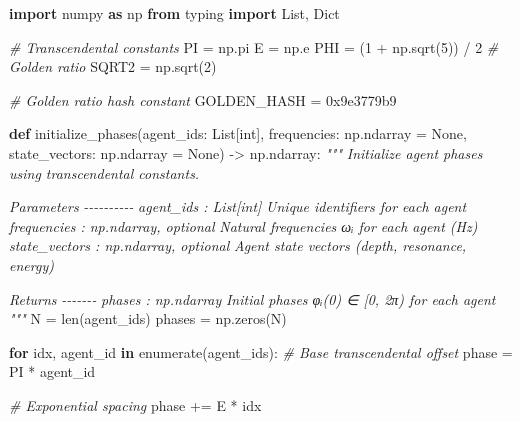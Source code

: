 \documentclass[
]{article}
\newenvironment{Shaded}{}{}
\newcommand{\BaseNTok}[1]{\textcolor[rgb]{0.25,0.63,0.44}{#1}}
\newcommand{\BuiltInTok}[1]{\textcolor[rgb]{0.00,0.50,0.00}{#1}}
\newcommand{\CommentTok}[1]{\textcolor[rgb]{0.38,0.63,0.69}{\textit{#1}}}
\newcommand{\ControlFlowTok}[1]{\textcolor[rgb]{0.00,0.44,0.13}{\textbf{#1}}}
\newcommand{\DecValTok}[1]{\textcolor[rgb]{0.25,0.63,0.44}{#1}}
\newcommand{\ImportTok}[1]{\textcolor[rgb]{0.00,0.50,0.00}{\textbf{#1}}}
\newcommand{\KeywordTok}[1]{\textcolor[rgb]{0.00,0.44,0.13}{\textbf{#1}}}
\newcommand{\NormalTok}[1]{#1}
\newcommand{\OperatorTok}[1]{\textcolor[rgb]{0.40,0.40,0.40}{#1}}
\newcommand{\VariableTok}[1]{\textcolor[rgb]{0.10,0.09,0.49}{#1}}
\begin{document}
\begin{Shaded}
\begin{Highlighting}[]
\ImportTok{import}\NormalTok{ numpy }\ImportTok{as}\NormalTok{ np}
\ImportTok{from}\NormalTok{ typing }\ImportTok{import}\NormalTok{ List, Dict}

\CommentTok{\# Transcendental constants}
\NormalTok{PI }\OperatorTok{=}\NormalTok{ np.pi}
\NormalTok{E }\OperatorTok{=}\NormalTok{ np.e}
\NormalTok{PHI }\OperatorTok{=}\NormalTok{ (}\DecValTok{1} \OperatorTok{+}\NormalTok{ np.sqrt(}\DecValTok{5}\NormalTok{)) }\OperatorTok{/} \DecValTok{2}  \CommentTok{\# Golden ratio}
\NormalTok{SQRT2 }\OperatorTok{=}\NormalTok{ np.sqrt(}\DecValTok{2}\NormalTok{)}

\CommentTok{\# Golden ratio hash constant}
\NormalTok{GOLDEN\_HASH }\OperatorTok{=} \BaseNTok{0x9e3779b9}

\KeywordTok{def}\NormalTok{ initialize\_phases(agent\_ids: List[}\BuiltInTok{int}\NormalTok{],}
\NormalTok{                     frequencies: np.ndarray }\OperatorTok{=} \VariableTok{None}\NormalTok{,}
\NormalTok{                     state\_vectors: np.ndarray }\OperatorTok{=} \VariableTok{None}\NormalTok{) }\OperatorTok{{-}\textgreater{}}\NormalTok{ np.ndarray:}
    \CommentTok{"""}
\CommentTok{    Initialize agent phases using transcendental constants.}

\CommentTok{    Parameters}
\CommentTok{    {-}{-}{-}{-}{-}{-}{-}{-}{-}{-}}
\CommentTok{    agent\_ids : List[int]}
\CommentTok{        Unique identifiers for each agent}
\CommentTok{    frequencies : np.ndarray, optional}
\CommentTok{        Natural frequencies ωᵢ for each agent (Hz)}
\CommentTok{    state\_vectors : np.ndarray, optional}
\CommentTok{        Agent state vectors (depth, resonance, energy)}

\CommentTok{    Returns}
\CommentTok{    {-}{-}{-}{-}{-}{-}{-}}
\CommentTok{    phases : np.ndarray}
\CommentTok{        Initial phases φᵢ(0) ∈ [0, 2π) for each agent}
\CommentTok{    """}
\NormalTok{    N }\OperatorTok{=} \BuiltInTok{len}\NormalTok{(agent\_ids)}
\NormalTok{    phases }\OperatorTok{=}\NormalTok{ np.zeros(N)}

    \ControlFlowTok{for}\NormalTok{ idx, agent\_id }\KeywordTok{in} \BuiltInTok{enumerate}\NormalTok{(agent\_ids):}
        \CommentTok{\# Base transcendental offset}
\NormalTok{        phase }\OperatorTok{=}\NormalTok{ PI }\OperatorTok{*}\NormalTok{ agent\_id}

        \CommentTok{\# Exponential spacing}
\NormalTok{        phase }\OperatorTok{+=}\NormalTok{ E }\OperatorTok{*}\NormalTok{ idx}


\end{Highlighting}
\end{Shaded}
\end{document}
